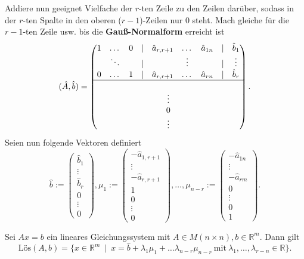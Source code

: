 Addiere nun geeignet Vielfache der $r$-ten Zeile zu den Zeilen darüber, sodass
in der $r$-ten Spalte in den oberen ($r-1$)-Zeilen nur 0 steht. Mach gleiche
für die $r-1$-ten Zeile usw. bis die \textbf{Gauß-Normalform} erreicht ist
\[
    (\hat{A}, \hat{b}) = \begin{pmatrix}
        1 & \dots & 0 & \mid & \hat{a}_{r,r+1} & \dots & \hat{a}_{1n} &\mid & \hat{b}_1\\
        & \ddots & & \mid & & \vdots & & \mid & \vdots\\
        0 & \dots & 1 & \mid & \hat{a}_{r,r+1} & \dots &  \hat{a}_{rn} & \mid & \hat{b}_r\\
        \hline\\
        \multicolumn{9}{c}{\vdots}\\
        \multicolumn{9}{c}{0}\\
        \multicolumn{9}{c}{\vdots}
    \end{pmatrix} 
.\]
Seien nun folgende Vektoren definiert
\[
    \hat{b}:=\begin{pmatrix}
        \hat{b}_1\\
        \vdots\\
        \hat{b}_r\\
        0\\
        \vdots\\
        0
    \end{pmatrix},
    \mu_1 := \begin{pmatrix}
        -\hat{a}_{1,r+1}\\
        \vdots\\
        -\hat{a}_{r,r+1}\\
        1\\
        0\\
        \vdots\\
        0
    \end{pmatrix},\dots,
    \mu_{n-r} := \begin{pmatrix}
        -\hat{a}_{1n}\\
        \vdots\\
        -\hat{a}_{rm}\\
        0\\
        \vdots\\
        0\\
        1
    \end{pmatrix}
.\]
\begin{theorem}
    Sei $Ax = b$ ein lineares Gleichungssystem mit $A\in M(n\times n), b\in \mathbb{R}^m$.
    Dann gilt
    \[
        \text{Lös}(A,b)=\{ x \in \mathbb{R}^m\ \mid\ x = \hat{b} + \lambda_1\mu_1 + \dots \lambda_{n-r}\mu_{n-r}\ \text{mit}\ \lambda_1,\dots,\lambda_{r-n} \in \mathbb{R} \}    
    .\]
\end{theorem}